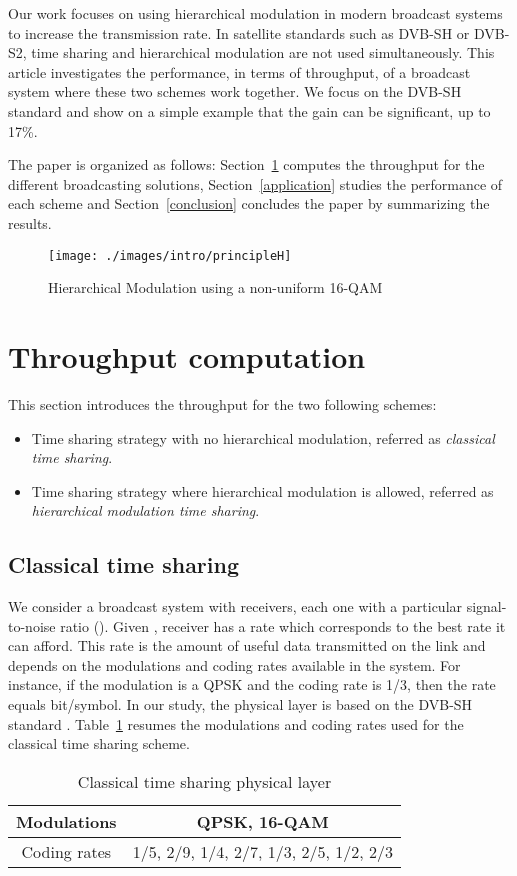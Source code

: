 \documentclass[conference, letterpaper]{IEEEtran}
\begin{document}
Our work focuses on using hierarchical modulation in modern broadcast systems to increase the transmission rate. In satellite standards such as DVB-SH or DVB-S2, time sharing and hierarchical modulation are not used simultaneously. This article investigates the performance, in terms of throughput, of a broadcast system where these two schemes work together. We focus on the DVB-SH standard and show on a simple example that the gain can be significant, up to 17\%. 
 
The paper is organized as follows: Section~\ref{achievable_rates} computes the throughput for the different broadcasting solutions, Section~\ref{application} studies the performance of each scheme and Section~\ref{conclusion} concludes the paper by summarizing the results.

\begin{figure}[!ht]
\centering
\texttt{[image: ./images/intro/principleH]}
\caption{Hierarchical Modulation using a non-uniform 16-QAM}
\label{hm_principle}
\end{figure}

 \section{Throughput computation}\label{achievable_rates}

This section introduces the throughput for the two following schemes:
\begin{itemize}
\item Time sharing strategy with no hierarchical modulation, referred as \emph{classical time sharing}.
\item Time sharing strategy where hierarchical modulation is allowed, referred as \emph{hierarchical modulation time sharing}.
\end{itemize}


\subsection{Classical time sharing}

We consider a broadcast system with  receivers, each one with a particular signal-to-noise ratio  (). Given , receiver  has a rate  which corresponds to the best rate it can afford. This rate is the amount of useful data transmitted on the link and depends on the modulations and coding rates available in the system. For instance, if the modulation is a QPSK and the coding rate is 1/3, then the rate equals  bit/symbol. In our study, the physical layer is based on the DVB-SH standard \cite{sh, DVBSH}. Table~\ref{cts} resumes the modulations and coding rates used for the classical time sharing scheme.
\begin{table}[!ht]
\renewcommand{\arraystretch}{1.1}
\caption{Classical time sharing physical layer}
\label{cts}
\centering
\begin{tabular}{c||c} 
\hline
Modulations & QPSK, 16-QAM \\ 
\hline
Coding rates & 1/5, 2/9, 1/4, 2/7, 1/3, 2/5, 1/2, 2/3\\
\hline 
\end{tabular}
\end{table}
\end{document}
